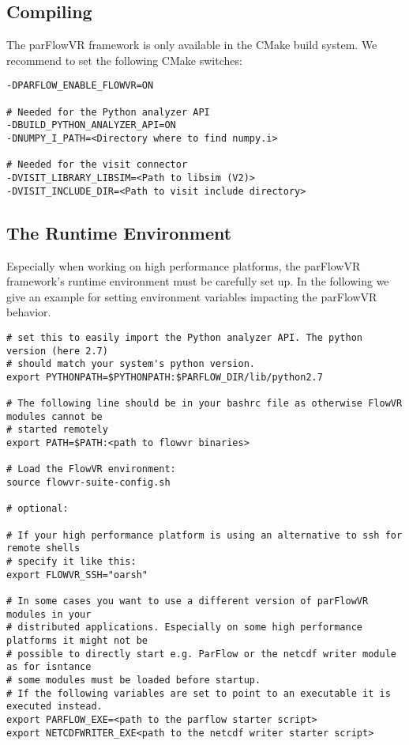 \subsection{Compiling}
The parFlowVR framework is only available in the CMake build system. We recommend to set the following
CMake switches:
\begin{display}\begin{verbatim}
-DPARFLOW_ENABLE_FLOWVR=ON

# Needed for the Python analyzer API
-DBUILD_PYTHON_ANALYZER_API=ON
-DNUMPY_I_PATH=<Directory where to find numpy.i>

# Needed for the visit connector
-DVISIT_LIBRARY_LIBSIM=<Path to libsim (V2)>
-DVISIT_INCLUDE_DIR=<Path to visit include directory>
\end{verbatim}\end{display}

\subsection{The Runtime Environment}
Especially when working on high performance platforms, the parFlowVR framework's runtime
environment must be carefully set up.
In the following we give an example for setting environment variables impacting the
parFlowVR behavior.
\begin{display}\begin{verbatim}
# set this to easily import the Python analyzer API. The python version (here 2.7)
# should match your system's python version.
export PYTHONPATH=$PYTHONPATH:$PARFLOW_DIR/lib/python2.7

# The following line should be in your bashrc file as otherwise FlowVR modules cannot be
# started remotely
export PATH=$PATH:<path to flowvr binaries>

# Load the FlowVR environment:
source flowvr-suite-config.sh

# optional:

# If your high performance platform is using an alternative to ssh for remote shells
# specify it like this:
export FLOWVR_SSH="oarsh"

# In some cases you want to use a different version of parFlowVR modules in your
# distributed applications. Especially on some high performance platforms it might not be
# possible to directly start e.g. ParFlow or the netcdf writer module as for isntance
# some modules must be loaded before startup.
# If the following variables are set to point to an executable it is executed instead.
export PARFLOW_EXE=<path to the parflow starter script>
export NETCDFWRITER_EXE<path to the netcdf writer starter script>
\end{verbatim}\end{display}

